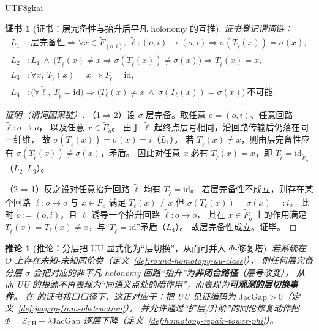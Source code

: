 \documentclass[12pt]{article}
\newtheorem{corollary}{推论}[section]
\newtheorem{Certificate}{证书}[section]
\newcommand{\GFramework}{\text{G-Framework}}
\newcommand{\JacGap}{\ensuremath{\mathrm{JacGap}}} %
\begin{document}
\begin{CJK*}{UTF8}{gkai}
\begin{Certificate}[证书：层完备性与抬升后平凡 holonomy 的互推]
\label{cert:layering-complete-iff-trivial-holonomy}
证书登记谓词链：
\[
\begin{aligned}
  L_1 &: \text{层完备性}\Rightarrow \forall x\in \widetilde F_{(o,i)},\ \widetilde\ell:(o,i)\to(o,i)\Rightarrow
    \sigma(T_{\widetilde\ell}(x))=\sigma(x),\\
  L_2 &: L_1\ \wedge\ \bigl(T_{\widetilde\ell}(x)\neq x\Rightarrow \sigma(T_{\widetilde\ell}(x))\neq \sigma(x)\bigr)
    \Rightarrow T_{\widetilde\ell}(x)=x,\\
  L_3 &: \forall x,\ T_{\widetilde\ell}(x)=x\Rightarrow T_{\widetilde\ell}=\mathrm{id},\\
  L_4 &: \bigl(\forall \widetilde\ell,\ T_{\widetilde\ell}=\mathrm{id}\bigr)\Rightarrow
  \bigl(T_{\ell}(x)\neq x\ \wedge\ \sigma(T_{\ell}(x))=\sigma(x)\bigr)\ \text{不可能}.
\end{aligned}
\]
\end{Certificate}

\begin{proof}[证明（谓词因果链）]
（1$\Rightarrow$2）设 $\sigma$ 层完备。取任意 $\widetilde o=(o,i)$、任意回路 $\widetilde\ell:\widetilde o\to\widetilde o$，
以及任意 $x\in\widetilde F_{\widetilde o}$。
由于 $\widetilde\ell$ 起终点层号相同，沿回路传输后仍落在同一纤维，
故 $\sigma(T_{\widetilde\ell}(x))=\sigma(x)=i$（$L_1$）。
若 $T_{\widetilde\ell}(x)\neq x$，则由层完备性应有 $\sigma(T_{\widetilde\ell}(x))\neq\sigma(x)$，矛盾。
因此对任意 $x$ 必有 $T_{\widetilde\ell}(x)=x$，即 $T_{\widetilde\ell}=\mathrm{id}_{\widetilde F_{\widetilde o}}$（$L_2$--$L_3$）。

（2$\Rightarrow$1）反之设对任意抬升回路 $\widetilde\ell$ 均有 $T_{\widetilde\ell}=\mathrm{id}$。
若层完备性不成立，则存在某个回路 $\ell:o\to o$ 与 $x\in F_o$ 满足 $T_{\ell}(x)\neq x$ 但 $\sigma(T_{\ell}(x))=\sigma(x)=:i$。
此时 $\widetilde o:=(o,i)$，且 $\ell$ 诱导一个抬升回路 $\widetilde\ell:\widetilde o\to\widetilde o$，
其在 $x\in \widetilde F_{\widetilde o}$ 上的作用满足 $T_{\widetilde\ell}(x)=T_{\ell}(x)\neq x$，与“$T_{\widetilde\ell}=\mathrm{id}
  $”矛盾（$L_4$）。
故层完备性成立。证毕。
\end{proof}

\begin{corollary}[推论：分层把 UU 显式化为“层切换”，从而可并入 $\Phi$-修复塔]
\label{cor:layering-makes-uu-repairable}
若系统在 $O$ 上存在未知-未知同伦类（定义~\ref{def:round-homotopy-uu-class}），
则任何层完备分层 $\sigma$ 会把对应的非平凡 holonomy 回路“抬升”为\textbf{非闭合路径}（层号改变），
从而 UU 的根源不再表现为“同语义点处的暗作用”，而表现为\textbf{可观测的层切换事件}。
在 \GFramework{} 的证书接口口径下，这正对应于：把 UU 见证编码为 $\JacGap>0$（定义~\ref{def:jacgap-from-obstruction}），
并允许通过“扩层/升阶”的同伦修复动作把 $\Phi=\mathcal{E}_{\mathrm{CH}}+\lambda\JacGap$ 逐层下降（定义~\ref{def:homotopy-repair-tower-phi}）。
\end{corollary}


\end{CJK*}
\end{document}
